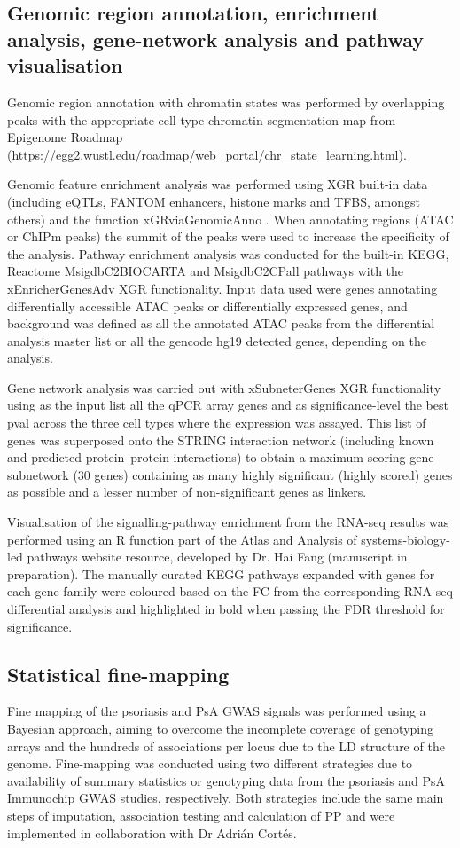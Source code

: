 \subsection{Genomic region annotation, enrichment analysis, gene-network analysis and pathway visualisation }
Genomic region annotation with chromatin states was performed by overlapping peaks with the appropriate cell type chromatin segmentation map from Epigenome Roadmap (\url{https://egg2.wustl.edu/roadmap/web_portal/chr_state_learning.html}).

Genomic feature enrichment analysis was performed using XGR built-in data (including eQTLs, FANTOM enhancers, histone marks and TFBS, amongst others) and the function xGRviaGenomicAnno \parencite{Fang2016}. When annotating regions (ATAC or ChIPm peaks) the summit of the peaks were used to increase the specificity of the analysis. Pathway enrichment analysis was conducted for the built-in KEGG, Reactome MsigdbC2BIOCARTA and MsigdbC2CPall pathways with the xEnricherGenesAdv XGR functionality. Input data used were genes annotating differentially accessible ATAC peaks or differentially expressed genes, and background was defined as all the annotated ATAC peaks from the differential analysis master list or all the gencode hg19 detected genes, depending on the analysis.

Gene network analysis was carried out with xSubneterGenes XGR functionality using as the input list all the qPCR array genes and as significance-level the best pval across the three cell types where the expression was assayed. This list of genes was superposed onto the STRING interaction network (including known and predicted protein–protein interactions) to obtain a maximum-scoring gene subnetwork (30 genes) containing as many highly significant (highly scored) genes as possible and a lesser number of non-significant genes as linkers.  

Visualisation of the signalling-pathway enrichment from the RNA-seq results was performed using an R function part of the Atlas and Analysis of systems-biology-led pathways website resource, developed by Dr. Hai Fang (manuscript in preparation). The manually curated KEGG pathways expanded with genes for each gene family were coloured based on the FC from the corresponding RNA-seq differential analysis and highlighted in bold when passing the FDR threshold for significance.


\subsection{Statistical fine-mapping}
Fine mapping of the psoriasis and PsA GWAS signals was performed using a Bayesian approach, aiming to overcome the incomplete coverage of genotyping arrays and the hundreds of associations per locus due to the LD structure of the genome. Fine-mapping was conducted using two different strategies due to availability of summary statistics or genotyping data from the psoriasis and PsA Immunochip GWAS studies, respectively. Both strategies include the same main steps of imputation, association testing and calculation of PP and were implemented in collaboration with Dr Adri\'{a}n Cort\'{e}s.


